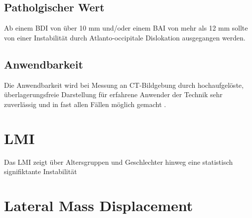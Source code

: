 \documentclass{report}
\begin{document}
\subsection{Patholgischer Wert}
Ab einem BDI von über 10 mm und/oder einem BAI von mehr als 12 mm sollte von einer Instabilität durch Atlanto-occipitale Dislokation ausgegangen werden.


\subsection{Anwendbarkeit}
Die Anwendbarkeit wird bei Messung an CT-Bildgebung durch hochaufgelöste, überlagerungsfreie Darstellung für erfahrene Anwender der Technik sehr zuverlässig und in fast allen Fällen möglich gemacht \cite{Dziurzynski2005,Radcliff2010}. 


\section{LMI}
Das LMI zeigt über Altersgruppen und Geschlechter hinweg eine statistisch signifiktante Instabilität \cite{Chaput2011}



\section{Lateral Mass Displacement}


\end{document}
